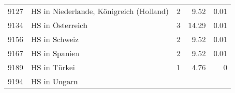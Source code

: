 \begin{longtable}{lXrrr}
     9127 &
     \multicolumn{1}{X}{ HS in Niederlande, Königreich (Holland)   } &


       \num{2} &
       \num[round-mode=places,round-precision=2]{9.52} &
         \num[round-mode=places,round-precision=2]{0.01} \\

     9134 &
     \multicolumn{1}{X}{ HS in Österreich   } &


       \num{3} &
       \num[round-mode=places,round-precision=2]{14.29} &
         \num[round-mode=places,round-precision=2]{0.01} \\

     9156 &
     \multicolumn{1}{X}{ HS in Schweiz   } &


       \num{2} &
       \num[round-mode=places,round-precision=2]{9.52} &
         \num[round-mode=places,round-precision=2]{0.01} \\

     9167 &
     \multicolumn{1}{X}{ HS in Spanien   } &


       \num{2} &
       \num[round-mode=places,round-precision=2]{9.52} &
         \num[round-mode=places,round-precision=2]{0.01} \\

     9189 &
     \multicolumn{1}{X}{ HS in Türkei   } &


       \num{1} &
       \num[round-mode=places,round-precision=2]{4.76} &
         \num[round-mode=places,round-precision=2]{0} \\

     9194 &
     \multicolumn{1}{X}{ HS in Ungarn   } &



\end{longtable}
